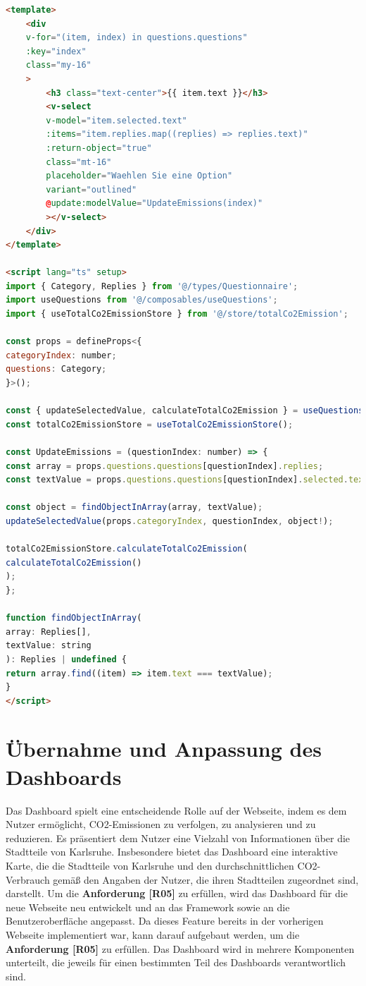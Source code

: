 \begin{lstlisting}[language={html}, caption={QuestionBlock.vue}]
<template>
    <div
    v-for="(item, index) in questions.questions"
    :key="index"
    class="my-16"
    >
        <h3 class="text-center">{{ item.text }}</h3>
        <v-select
        v-model="item.selected.text"
        :items="item.replies.map((replies) => replies.text)"
        :return-object="true"
        class="mt-16"
        placeholder="Waehlen Sie eine Option"
        variant="outlined"
        @update:modelValue="UpdateEmissions(index)"
        ></v-select>
    </div>
</template>

<script lang="ts" setup>
import { Category, Replies } from '@/types/Questionnaire';
import useQuestions from '@/composables/useQuestions';
import { useTotalCo2EmissionStore } from '@/store/totalCo2Emission';

const props = defineProps<{
categoryIndex: number;
questions: Category;
}>();

const { updateSelectedValue, calculateTotalCo2Emission } = useQuestions();
const totalCo2EmissionStore = useTotalCo2EmissionStore();

const UpdateEmissions = (questionIndex: number) => {
const array = props.questions.questions[questionIndex].replies;
const textValue = props.questions.questions[questionIndex].selected.text;

const object = findObjectInArray(array, textValue);
updateSelectedValue(props.categoryIndex, questionIndex, object!);

totalCo2EmissionStore.calculateTotalCo2Emission(
calculateTotalCo2Emission()
);
};

function findObjectInArray(
array: Replies[],
textValue: string
): Replies | undefined {
return array.find((item) => item.text === textValue);
}
</script>
\end{lstlisting}

\section{Übernahme und Anpassung des Dashboards}

Das Dashboard spielt eine entscheidende Rolle auf der Webseite, indem es dem Nutzer ermöglicht, CO2-Emissionen zu verfolgen, zu analysieren und zu reduzieren. Es präsentiert dem Nutzer eine Vielzahl von Informationen über die Stadtteile von Karlsruhe. Insbesondere bietet das Dashboard eine interaktive Karte, die die Stadtteile von Karlsruhe und den durchschnittlichen CO2-Verbrauch gemäß den Angaben der Nutzer, die ihren Stadtteilen zugeordnet sind, darstellt. Um die \textbf{Anforderung [R05]} zu erfüllen, wird das Dashboard für die neue Webseite neu entwickelt und an das Framework sowie an die Benutzeroberfläche angepasst. Da dieses Feature bereits in der vorherigen Webseite implementiert war, kann darauf aufgebaut werden, um die \textbf{Anforderung [R05]} zu erfüllen. Das Dashboard wird in mehrere Komponenten unterteilt, die jeweils für einen bestimmten Teil des Dashboards verantwortlich sind.

